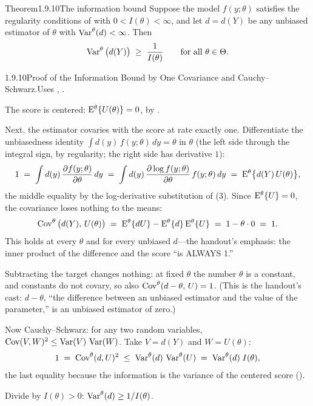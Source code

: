 \documentclass[main.tex]{subfiles}
\begin{document}
\begin{Obj}{Theorem}{1.9.10}{The information bound}
Suppose the model $f(y;\theta)$ satisfies the regularity conditions of  with
$0<I(\theta)<\infty$, and let $d=d(Y)$ be any unbiased estimator of $\theta$ with
$\operatorname{Var}^{\theta}(d)<\infty$. Then
\[ \operatorname{Var}^{\theta}\big(d(Y)\big) \;\ge\; \frac{1}{I(\theta)}
   \qquad\text{for all } \theta\in\Theta . \]
\end{Obj}
\begin{Prf}{1.9.10}{Proof of the Information Bound by One Covariance and Cauchy--Schwarz.}{Uses , .}
\item The score is centered: $\mathrm{E}^{\theta}\{U(\theta)\}=0$, by .
\item Next, the estimator covaries with the score at rate exactly one. Differentiate the
      unbiasedness identity $\int d(y)\,f(y;\theta)\,dy=\theta$ in $\theta$ (the left side
      through the integral sign, by regularity; the right side has derivative $1$):
      \[ 1 \;=\; \int d(y)\,\frac{\partial f(y;\theta)}{\partial\theta}\,dy
         \;=\; \int d(y)\,\frac{\partial \log f(y;\theta)}{\partial\theta}\,
         f(y;\theta)\,dy
         \;=\; \mathrm{E}^{\theta}\big\{ d(Y)\,U(\theta) \big\} , \]
      the middle equality by the log-derivative substitution of (3). Since
      $\mathrm{E}^{\theta}\{U\}=0$, the covariance loses nothing to the means:
      \[ \operatorname{Cov}^{\theta}\big(d(Y),\,U(\theta)\big)
         \;=\; \mathrm{E}^{\theta}\{dU\} - \mathrm{E}^{\theta}\{d\}\,\mathrm{E}^{\theta}\{U\}
         \;=\; 1 - \theta\cdot 0 \;=\; 1 . \]
      This holds at every $\theta$ and for every unbiased $d$---the handout's emphasis: the
      inner product of the difference and the score ``is ALWAYS 1.''
\item Subtracting the target changes nothing: at fixed $\theta$ the number $\theta$ is
      a constant, and constants do not covary, so also
      $\operatorname{Cov}^{\theta}(d-\theta,\,U)=1$. (This is the handout's cast: $d-\theta$, ``the
      difference between an unbiased estimator and the value of the parameter,'' is an
      unbiased estimator of zero.)
\item Now Cauchy--Schwarz: for any two random variables,
      $\operatorname{Cov}(V,W)^2\le \operatorname{Var}(V)\,\operatorname{Var}(W)$. Take $V=d(Y)$ and $W=U(\theta)$:
      \[ 1 \;=\; \operatorname{Cov}^{\theta}(d,U)^2 \;\le\; \operatorname{Var}^{\theta}(d)\,\operatorname{Var}^{\theta}(U)
         \;=\; \operatorname{Var}^{\theta}(d)\; I(\theta) , \]
      the last equality because the information is the variance of the centered score
      ().
\item Divide by $I(\theta)>0$: $\operatorname{Var}^{\theta}(d)\ge 1/I(\theta)$.
\end{Prf}
\end{document}
